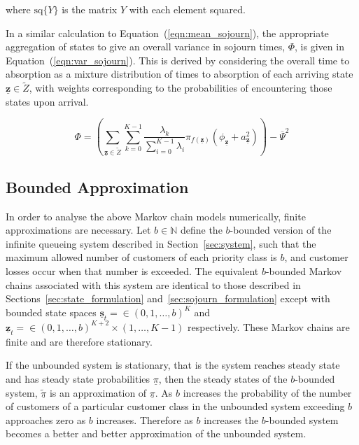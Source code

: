 \documentclass{article}
\begin{document}
where $\text{sq}\{Y\}$ is the matrix $Y$ with each element squared.

In a similar calculation to Equation~(\ref{eqn:mean_sojourn}), the appropriate
aggregation of states to give an overall variance in sojourn times, $\Phi$, is
given in Equation~(\ref{eqn:var_sojourn}).
This is derived by considering the overall time to absorption as a mixture
distribution of times to absorption of each arriving state
$\underline{\mathbf{z}} \in \tilde{Z}$, with weights corresponding to the
probabilities of encountering those states upon arrival.

\begin{equation}\label{eqn:var_sojourn}
\Phi = \left(\sum_{\underline{\mathbf{z}} \in \tilde{Z}} \sum_{k=0}^{K-1} \frac{\lambda_k}{\sum_{i=0}^{K-1} \lambda_i} \pi_{f(\underline{\mathbf{z}})} \left(\phi_{\underline{\mathbf{z}}} + a_{\underline{\mathbf{z}}}^2 \right) \right) - \overline{\Psi}^2
\end{equation}


\subsection{Bounded Approximation}\label{sec:bound}
In order to analyse the above Markov chain models numerically, finite
approximations are necessary. Let $b \in \mathbb{N}$ define the $b$-bounded
version of the infinite queueing system described in Section~\ref{sec:system},
such that the maximum allowed number of customers of each priority class is $b$,
and customer losses occur when that number is exceeded.
The equivalent $b$-bounded Markov chains associated with this system are
identical to those described in Sections~\ref{sec:state_formulation}
and~\ref{sec:sojourn_formulation} except with bounded state spaces
$\underline{\mathbf{s}}_t = \in (0, 1, \dots, b)^K$ and
$\underline{\mathbf{z}}_t = \in (0, 1, \dots, b)^{K+2} \times (1, \dots, K - 1)$
respectively.
These Markov chains are finite and are therefore stationary.

If the unbounded system is stationary, that is the system reaches steady state
and has steady state probabilities $\underline{\pi}$, then the steady states of
the $b$-bounded system, $\underline{\tilde{\pi}}$ is an approximation of
$\underline{\pi}$.
As $b$ increases the probability of the number of customers of a particular
customer class in the unbounded system exceeding $b$ approaches zero as $b$
increases. Therefore as $b$ increases the $b$-bounded system becomes a better
and better approximation of the unbounded system.
\end{document}
